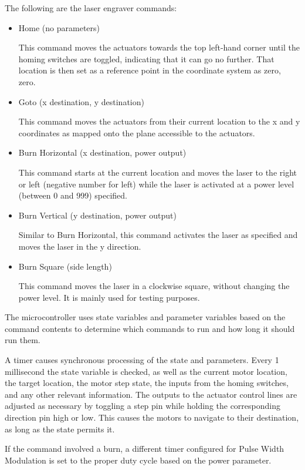 \documentclass[11pt]{LaTeX-Classes/math-hw}
\begin{document}
The following are the laser engraver commands:
\begin{itemize}
  \item Home (no parameters)

    This command moves the actuators towards the top left-hand corner until the homing switches
    are toggled, indicating that it can go no further.
    That location is then set as a reference point in the coordinate system as zero, zero.

  \item Goto (x destination, y destination)
    
    This command moves the actuators from their current location to the x and y coordinates
    as mapped onto the plane accessible to the actuators.

  \item Burn Horizontal (x destination, power output)

    This command starts at the current location and moves the laser to the right or left (negative number for left)
    while the laser is activated at a power level (between 0 and 999) specified.

  \item Burn Vertical (y destination, power output)
    
    Similar to Burn Horizontal, this command activates the laser as specified and moves the laser in the
    y direction.

  \item Burn Square (side length)

    This command moves the laser in a clockwise square, without changing the power level. It is
    mainly used for testing purposes.
\end{itemize}

The microcontroller uses state variables and parameter variables based on the command contents to determine which commands
to run and how long it should run them.

A timer causes synchronous processing of the state and parameters. Every 1 millisecond
the state variable is checked, as well as the current motor location, the target location,
the motor step state, the inputs from the homing switches, and any other relevant information.
The outputs to the actuator control lines are adjusted as necessary by toggling a step pin while
holding the corresponding direction pin high or low.
This causes the motors to navigate to their destination, as long as the state permits it.

If the command involved a burn, a different timer configured for Pulse Width Modulation is set
to the proper duty cycle based on the power parameter.
\end{document}
